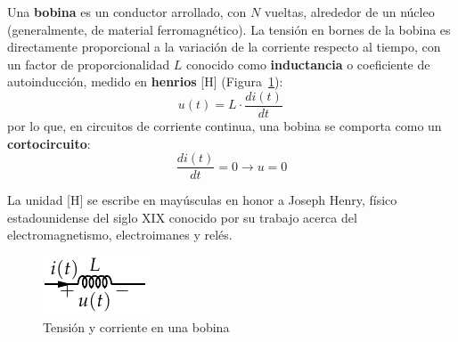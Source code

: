 	Una \textbf{bobina} es un conductor arrollado, con $N$
        vueltas, alrededor de un núcleo (generalmente, de material
        ferromagnético). La tensión en bornes de la bobina es
        directamente proporcional a la variación de la corriente
        respecto al tiempo, con un factor de proporcionalidad $L$
        conocido como \textbf{inductancia} o coeficiente de
        autoinducción, medido en \textbf{henrios} [H]
        (Figura~\ref{fig:bobina}):
	\begin{equation}\label{eq.u_L}
          \boxed{u(t)=L\cdot\frac{di(t)}{dt}}\,
	\end{equation}
	por lo que, en circuitos de corriente continua, una bobina se
        comporta como un \textbf{cortocircuito}:
	\begin{equation*}
          \dfrac{di(t)}{dt} = 0 \rightarrow u = 0
	\end{equation*}
	\begin{remark}
          La unidad [H] se escribe en mayúsculas en honor a Joseph
          Henry, físico estadounidense del siglo XIX conocido por su
          trabajo acerca del electromagnetismo, electroimanes y relés.
	\end{remark}
	\begin{figure}[H]
          \centering
          \includegraphics[width=0.15\linewidth]{../figs/Bobina.pdf}
          \caption{Tensión y corriente en una bobina}
          \label{fig:bobina}
	\end{figure}
	
